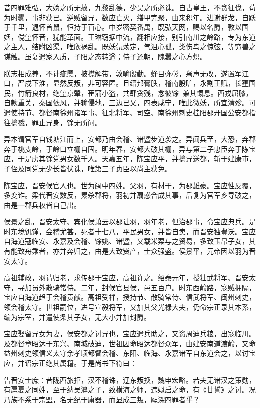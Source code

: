 \documentclass[]{article}
\begin{document}
昔四罪难弘，大妫之所无赦，九黎乱德，少昊之所必诛。自古皇王，不贪征伐，苟为时蠹，事非获已。逆贼留异，数应亡灭，缮甲完聚，由来积年。进谢群龙，自跃于千里，退怀首鼠，恒持于百心。中岁密契番禺，既弘天网，赐以名爵，敦以国姻，傥望怀音，犹能革面。王琳窃据中流，翻相应接，别引南川之岭路，专为东道之主人，结附凶渠，唯欣祸乱。既妖氛荡定，气沮心孤，类伤鸟之惊弦，等穷兽之谋触。虽复遣家入质，子阳之态转遒；侍子还朝，隗嚣之心方炽。

朕志相成养，不计疵慝，披襟解带，敦喻殷勤。蜂目弥彰，枭声无改，遂置军江口，严戍下淮，显然反叛，非可容匿。且缙邦膏腴，稽南殷旷，永割王赋，长壅国民，竹箭良材，绝望京辇，萑蒲小盗，共肆贪残，念彼馀，兼其慨息。西戎屈膝，自款重关，秦国依风，并输侵地，三边已乂，四表咸宁，唯此微妖，所宜清殄。可遣使持节、都督南徐州诸军事、征北将军、司空、南徐州刺史桂阳郡开国公安都指往擒戮，罪止异身，馀无所问。

异本谓官军自钱塘江而上，安都乃由会稽、诸暨步道袭之。异闻兵至，大恐，弃郡奔于桃支岭，于岭口立栅自固。明年春，安都大破其栅，异与第二子忠臣奔于陈宝应，于是虏其馀党男女数千人。天嘉五年，陈宝应平，并擒异送都，斩于建康市，子侄及同党无少长皆伏诛，唯第三子贞臣以尚主获免。

陈宝应，晋安候官人也。世为闽中四姓。父羽，有材干，为郡雄豪。宝应性反覆，多变诈。梁代晋安数反，累杀郡将，羽初并扇惑合成其事，后复为官军乡导破之，由是一郡兵权皆自己出。

侯景之乱，晋安太守、宾化侯萧云以郡让羽，羽年老，但治郡事，令宝应典兵。是时东境饥馑，会稽尤甚，死者十七八，平民男女，并皆自卖，而晋安独豊沃。宝应自海道寇临安、永嘉及会稽、馀姚、诸暨，又载米粟与之贸易，多致玉帛子女，其有能致舟乘者，亦并奔归之，由是大致赀产，士众强盛。侯景平，元帝因以羽为晋安太守。

高祖辅政，羽请归老，求传郡于宝应，高祖许之。绍泰元年，授壮武将军、晋安太守，寻加员外散骑常侍。二年，封候官县侯，邑五百户。时东西岭路，寇贼拥隔，宝应自海道趋于会稽贡献。高祖受禅，授持节、散骑常侍、信武将军、闽州刺史，领会稽太守。世祖嗣位，进号宣毅将军，又加其父光禄大夫，仍命宗正录其本系，编为宗室，并遣使条其子女，无大小并加封爵。

宝应娶留异女为妻，侯安都之讨异也，宝应遣兵助之，又资周迪兵粮，出寇临川。及都督章昭达于东兴、南城破迪，世祖因命昭达都督众军，由建安南道渡岭，又命益州刺史领信义太守余孝顷都督会稽、东阳、临海、永嘉诸军自东道会之，以讨宝应，并诏宗正绝其属籍。于是尚书下符曰：

告晋安士庶：昔陇西旅拒，汉不稽诛，辽东叛换，魏申宏略。若夫无诸汉之策勋，有扈夏之同姓，至于纳吴濞之子，致横海之师，违姒启之命，有《甘誓》之讨。况乃族不系于宗盟，名无纪于庸器，而显成三叛，飐深四罪者乎？
\end{document}
